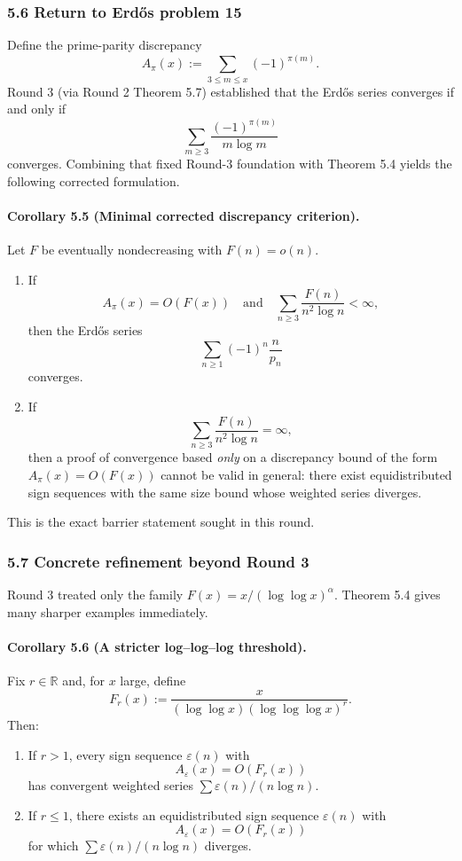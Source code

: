 \subsubsection{5.6 Return to Erd\H{o}s problem 15}

Define the prime-parity discrepancy
\[
A_\pi(x):=\sum_{3\le m\le x}(-1)^{\pi(m)}.
\]
Round 3 (via Round 2 Theorem 5.7) established that the Erd\H{o}s series converges if and only if
\[
\sum_{m\ge 3}\frac{(-1)^{\pi(m)}}{m\log m}
\]
converges.  Combining that fixed Round-3 foundation with Theorem 5.4 yields the following corrected formulation.

\paragraph{Corollary 5.5 (Minimal corrected discrepancy criterion).}
Let $F$ be eventually nondecreasing with $F(n)=o(n)$.
\begin{enumerate}
\item If
\[
A_\pi(x)=O(F(x))
\quad\text{and}\quad
\sum_{n\ge 3}\frac{F(n)}{n^2\log n}<\infty,
\]
then the Erd\H{o}s series
\[
\sum_{n\ge 1}(-1)^n\frac{n}{p_n}
\]
converges.
\item If
\[
\sum_{n\ge 3}\frac{F(n)}{n^2\log n}=\infty,
\]
then a proof of convergence based \emph{only} on a discrepancy bound of the form $A_\pi(x)=O(F(x))$ cannot be valid in general: there exist equidistributed sign sequences with the same size bound whose weighted series diverges.
\end{enumerate}


This is the exact barrier statement sought in this round.

\subsubsection{5.7 Concrete refinement beyond Round 3}

Round 3 treated only the family $F(x)=x/(\log\log x)^\alpha$.  Theorem 5.4 gives many sharper examples immediately.

\paragraph{Corollary 5.6 (A stricter log--log--log threshold).}
Fix $r\in\mathbb{R}$ and, for $x$ large, define
\[
F_r(x):=\frac{x}{(\log\log x)(\log\log\log x)^r}.
\]
Then:
\begin{enumerate}
\item If $r>1$, every sign sequence $\varepsilon(n)$ with
\[
A_\varepsilon(x)=O(F_r(x))
\]
has convergent weighted series $\sum \varepsilon(n)/(n\log n)$.
\item If $r\le 1$, there exists an equidistributed sign sequence $\varepsilon(n)$ with
\[
A_\varepsilon(x)=O(F_r(x))
\]
for which $\sum \varepsilon(n)/(n\log n)$ diverges.
\end{enumerate}


